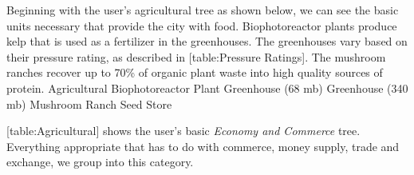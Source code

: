 Beginning with the user's agricultural tree as shown below, we can see the basic units necessary that provide the city with food. Biophotoreactor plants produce kelp that is used as a fertilizer in the greenhouses. The greenhouses vary based on their pressure rating, as described in [table:Pressure Ratings]. The mushroom ranches recover up to 70\% of organic plant waste into high quality sources of protein.
{
    \bTABLE[split=repeat]
    \setupTABLE[row][1][align=yes]
    \setupTABLE[row][each][align=center]
    \bTABLEhead
    \bTR
      \bTH Agricultural \eTH
    \eTR
    \eTABLEhead
    \bTABLEbody
    \bTR
      \bTC Biophotoreactor Plant \eTC
    \eTR
    \bTR
      \bTC Greenhouse (68 mb) \eTC
    \eTR
    \bTR
      \bTC Greenhouse (340 mb) \eTC
    \eTR
    \bTR
      \bTC Mushroom Ranch \eTC
    \eTR
    \bTR
      \bTC Seed Store \eTC
    \eTR
\eTABLEbody
\eTABLE
}

[table:Agricultural] shows the user's basic {\it Economy and Commerce} tree. Everything appropriate that has to do with commerce, money supply, trade and exchange, we group into this category.

